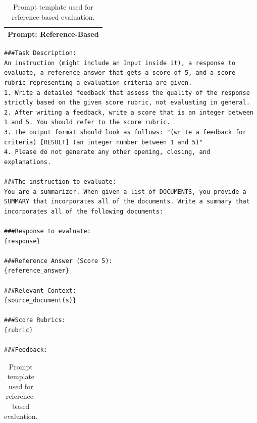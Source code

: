 \begin{table}[h]
\centering
\footnotesize
\begin{tabular}{p{}}
\footnotesize
\toprule
\textbf{Prompt: Reference-Based} \\
\midrule
\end{tabular}
\begin{lstlisting}[style=promptstyle]
###Task Description:
An instruction (might include an Input inside it), a response to evaluate, a reference answer that gets a score of 5, and a score rubric representing a evaluation criteria are given.
1. Write a detailed feedback that assess the quality of the response strictly based on the given score rubric, not evaluating in general.
2. After writing a feedback, write a score that is an integer between 1 and 5. You should refer to the score rubric.
3. The output format should look as follows: "(write a feedback for criteria) [RESULT] (an integer number between 1 and 5)"
4. Please do not generate any other opening, closing, and explanations.

###The instruction to evaluate:
You are a summarizer. When given a list of DOCUMENTS, you provide a SUMMARY that incorporates all of the documents. Write a summary that incorporates all of the following documents:

###Response to evaluate:
{response}

###Reference Answer (Score 5):
{reference_answer}

###Relevant Context:
{source_document(s)}

###Score Rubrics:
{rubric}

###Feedback: 
\end{lstlisting}
\begin{tabular}{p{\columnwidth}}
\bottomrule
\end{tabular}
\caption{Prompt template used for reference-based evaluation.}
\label{tab:prompt-reference-based}
\end{table}



